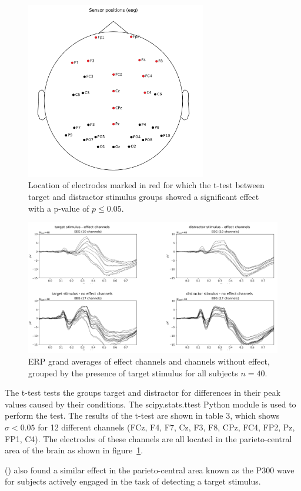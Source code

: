 \documentclass[a4paper]{article}
\newcommand{\caay}[2][]{
\citeauthor{#2} (\citeyear[#1]{#2})\xspace
}
\begin{document}
\begin{figure}[tbh!] 
  \centering
     \includegraphics[width=0.7\textwidth]{effectChannels.png}
  \caption{Location of electrodes marked in red for which the t-test between target and distractor stimulus groups showed a significant effect with a p-value of $p \leq 0.05$.}
  \label{fig:effectChannels}
\end{figure}

\begin{figure}[tbh!] 
  \centering
     \includegraphics[width=1.1\textwidth]{erpGrandAverage.png}
  \caption{ERP grand averages of effect channels and channels without effect, grouped by the presence of target stimulus for all subjects $n=40$.}
  \label{fig:erpGrandAverage}
\end{figure}
\FloatBarrier
The t-test tests the groups target and distractor for differences in their peak values caused by their conditions.
The scipy.stats.ttest Python module is used to perform the test.
The results of the t-test are shown in table 3, which shows $\sigma < 0.05$ for 12 different channels (FCz, F4, F7, Cz, F3, F8, CPz, FC4, FP2, Pz, FP1, C4).
The electrodes of these channels are all located in the parieto-central area of the brain as shown in figure~\ref{fig:effectChannels}.
\caay{picton1992} also found a similar effect in the parieto-central area known as the P300 wave for subjects actively engaged in the task of detecting a target stimulus. 
\end{document}
